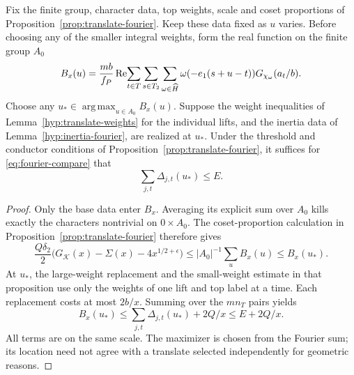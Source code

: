 \begin{auxlemma}\label{lem:maximizing-translate}
Fix the finite group, character data, top weights, scale and coset
proportions of Proposition~\ref{prop:translate-fourier}. Keep these
data fixed as \(u\) varies. Before choosing any of the smaller integral
weights, form the real function on the finite group \(A_0\)
\[
 B_x(u)=\frac{mb}{f_P}\operatorname{Re}\!
       \sum_{t\in T}\sum_{s\in T_2}\sum_{\omega\in\widehat H}
       \omega(-e_1(s+u-t))G_{\chi_\omega}(a_t/b).
\]
Choose any \(u_*\in\operatorname*{arg\,max}_{u\in A_0}B_x(u)\).
Suppose the weight inequalities of Lemma~\ref{hyp:translate-weights}
for the individual lifts, and the inertia data of Lemma~\ref{hyp:inertia-fourier},
are realized at \(u_*\). Under the threshold and conductor conditions
of Proposition~\ref{prop:translate-fourier}, it suffices for
\eqref{eq:fourier-compare} that
\[
             \sum_{j,t}\Delta_{j,t}(u_*)\le E.
\]
\end{auxlemma}
\begin{proof}
Only the base data enter \(B_x\). Averaging its explicit sum over \(A_0\)
kills exactly the characters nontrivial on \(0\times A_0\).
The coset-proportion calculation in Proposition~\ref{prop:translate-fourier}
therefore gives
\[
 \frac{Q\delta_2}{2}
   \bigl(G_{\mathcal K}(x)-\Sigma(x)-4x^{1/2+\epsilon}\bigr)
 \le |A_0|^{-1}\sum_u B_x(u) \le B_x(u_*).
\]
At \(u_*\), the large-weight replacement and the small-weight estimate
in that proposition use only the weights of one lift and top label at
a time. Each replacement costs at most \(2b/x\).
Summing over the \(mn_T\) pairs yields
\[
 B_x(u_*)\le\sum_{j,t}\Delta_{j,t}(u_*)+2Q/x\le E+2Q/x.
\]
All terms are on the same scale. The maximizer is chosen from the
Fourier sum; its location need not agree with a translate selected
independently for geometric reasons.
\end{proof}


